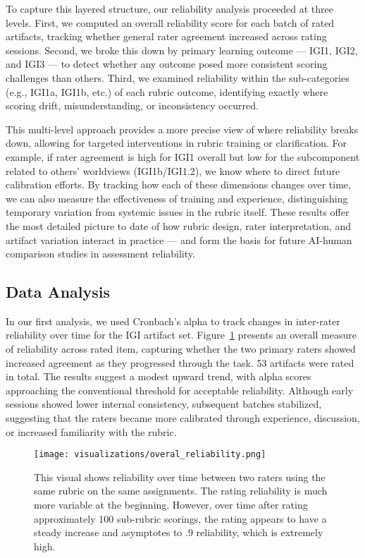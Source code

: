 \documentclass[12pt]{article}%
\begin{document}
To capture this layered structure, our reliability analysis proceeded at three levels. First, we computed an overall reliability score for each batch of rated artifacts, tracking whether general rater agreement increased across rating sessions. Second, we broke this down by primary learning outcome — IGI1, IGI2, and IGI3 — to detect whether any outcome posed more consistent scoring challenges than others. Third, we examined reliability within the sub-categories (e.g., IGI1a, IGI1b, etc.) of each rubric outcome, identifying exactly where scoring drift, misunderstanding, or inconsistency occurred.

This multi-level approach provides a more precise view of where reliability breaks down, allowing for targeted interventions in rubric training or clarification. For example, if rater agreement is high for IGI1 overall but low for the subcomponent related to others’ worldviews (IGI1b/IGI1.2), we know where to direct future calibration efforts. By tracking how each of these dimensions changes over time, we can also measure the effectiveness of training and experience, distinguishing temporary variation from systemic issues in the rubric itself. These results offer the most detailed picture to date of how rubric design, rater interpretation, and artifact variation interact in practice — and form the basis for future AI-human comparison studies in assessment reliability.


\subsection*{Data Analysis}

In our first analysis, we used Cronbach’s alpha \cite{cronbachalpha} to track changes in inter-rater reliability over time for the IGI artifact set. Figure~\ref{fig:overal_reliability} presents an overall measure of reliability across rated item, capturing whether the two primary raters showed increased agreement as they progressed through the task. 53 artifacts were rated in total. The results suggest a modest upward trend, with alpha scores approaching the conventional threshold for acceptable reliability. Although early sessions showed lower internal consistency, subsequent batches stabilized, suggesting that the raters became more calibrated through experience, discussion, or increased familiarity with the rubric.

\begin{figure}[h]
    \centering
    \texttt{[image: visualizations/overal\_reliability.png]}
    \caption{This visual shows reliability over time between two raters using the same rubric on the same assignments. The rating reliability is much more variable at the beginning. However, over time after rating approximately 100 sub-rubric scorings, the rating appears to have a steady increase and asymptotes to .9 reliability, which is extremely high.}
    \label{fig:overal_reliability}
\end{figure}
\end{document}

